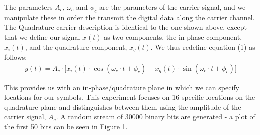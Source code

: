 \documentclass{article}
\begin{document}
The parameters $A_c$, $\omega_c$ and $\phi_c$ are the parameters of the carrier signal, and we manipulate these in order the transmit the digital data along the carrier channel. The Quadrature carrier description is identical to the one shown above, except that we define our signal $x(t)$ as two components, the in-phase component, $x_i(t)$, and the quadrature component, $x_q(t)$. We thus redefine equation (1) as follows:
\begin{align}
	y(t) = A_c \cdot \big[x_i(t) \cdot \cos(\omega_c \cdot t + \phi_c) - x_q(t) \cdot \sin(\omega_c \cdot t + \phi_c)\big]
\end{align}

This provides us with an in-phase/quadrature plane in which we can specify locations for our symbols. This experiment focuses on 16 specific locations on the quadrature plane and distinguishes between them using the amplitude of the carrier signal, $A_c$. A random stream of 30000 binary bits are generated - a plot of the first 50 bits can be seen in Figure 1.
\end{document}
